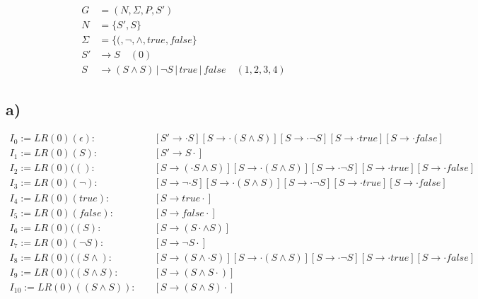 \begin{equation*}
\begin{split}
	G &= (N, \Sigma, P, S') \\[1ex]
	N &= \{ S', S \} \\[1ex]
	\Sigma &= \{ (, \neg, \land, true, false \} \\[1ex]
	S' &\rightarrow S \quad(0) \\
	S &\rightarrow (S \land S) \,|\, \neg S \,|\, true \,|\, false \quad(1, 2, 3, 4)
\end{split}
\end{equation*}

\subsection*{a)}

\begin{equation*}
\begin{split}
	I_0 := LR(0)(\epsilon):\quad &[S' \rightarrow \cdot S][S \rightarrow \cdot (S\land S)][S \rightarrow \cdot \neg S][S \rightarrow \cdot true][S \rightarrow \cdot false]\\
	I_1 := LR(0)(S):\quad &[S' \rightarrow S \cdot]\\
	I_2 := LR(0)(():\quad &[S \rightarrow (\cdot S \land S)][S \rightarrow \cdot (S\land S)][S \rightarrow \cdot \neg S][S \rightarrow \cdot true][S \rightarrow \cdot false]\\
	I_3 := LR(0)(\neg ):\quad &[S \rightarrow \neg \cdot S][S \rightarrow \cdot (S\land S)][S \rightarrow \cdot \neg S][S \rightarrow \cdot true][S \rightarrow \cdot false]\\
	I_4 := LR(0)(true):\quad &[S \rightarrow true \cdot]\\
	I_5 := LR(0)(false):\quad &[S \rightarrow false \cdot]\\
	I_6 := LR(0)((S):\quad &[S \rightarrow (S \cdot \land S)]\\
	I_7 := LR(0)(\neg S):\quad &[S \rightarrow \neg S \cdot]\\
	I_8 := LR(0)((S \land):\quad &[S \rightarrow (S \land \cdot S)][S \rightarrow \cdot (S\land S)][S \rightarrow \cdot \neg S][S \rightarrow \cdot true][S \rightarrow \cdot false]\\
	I_9 := LR(0)((S \land S):\quad &[S \rightarrow (S \land S \cdot )]\\
	I_{10} := LR(0)((S \land S)):\quad &[S \rightarrow (S \land S) \cdot]\\
\end{split}
\end{equation*}
